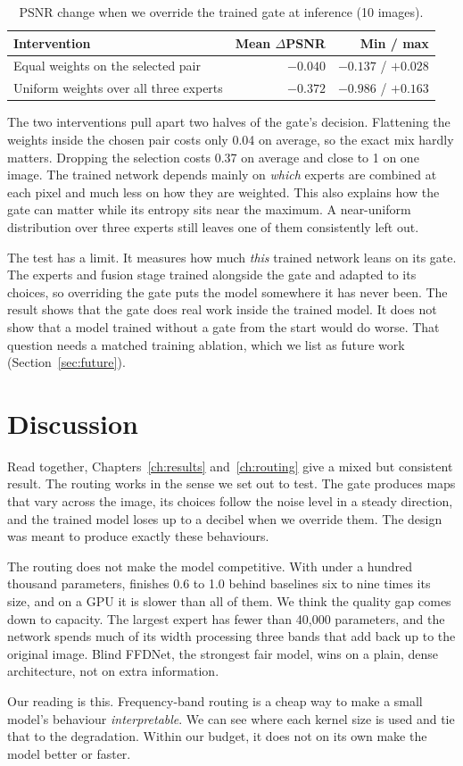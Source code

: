 \begin{table}[htbp]
	\centering
	\caption{PSNR change when we override the trained gate at inference (10 images).}
	\label{tab:interventions}
	\begin{tabular}{@{}lrr@{}}
		\toprule
		Intervention & Mean $\Delta$PSNR & Min / max \\
		\midrule
		Equal weights on the selected pair    & $-0.040$\dB & $-0.137$ / $+0.028$ \\
		Uniform weights over all three experts & $-0.372$\dB & $-0.986$ / $+0.163$ \\
		\bottomrule
	\end{tabular}
\end{table}

The two interventions pull apart two halves of the gate's decision.
Flattening the weights inside the chosen pair costs only 0.04\dB{} on
average, so the exact mix hardly matters. Dropping the selection costs
0.37\dB{} on average and close to 1\dB{} on one image. The trained network
depends mainly on \emph{which} experts are combined at each pixel and much
less on how they are weighted. This also explains how the gate can matter
while its entropy sits near the maximum. A near-uniform distribution over
three experts still leaves one of them consistently left out.

The test has a limit. It measures how much \emph{this} trained network leans
on its gate. The experts and fusion stage trained alongside the gate and
adapted to its choices, so overriding the gate puts the model somewhere it
has never been. The result shows that the gate does real work inside the
trained model. It does not show that a model trained without a gate from the
start would do worse. That question needs a matched training ablation, which
we list as future work (Section~\ref{sec:future}).

\section{Discussion}\label{sec:discussion}

Read together, Chapters~\ref{ch:results} and~\ref{ch:routing} give a mixed
but consistent result. The routing works in the sense we set out to test. The
gate produces maps that vary across the image, its choices follow the noise
level in a steady direction, and the trained model loses up to a decibel when
we override them. The design was meant to produce exactly these behaviours.

The routing does not make the model competitive. With under a hundred
thousand parameters, \fcsg{} finishes 0.6 to 1.0\dB{} behind baselines six to
nine times its size, and on a GPU it is slower than all of them. We think
the quality gap comes down to capacity. The largest expert has fewer than
40,000 parameters, and the network spends much of its width processing three
bands that add back up to the original image. Blind FFDNet, the strongest
fair model, wins on a plain, dense architecture, not on extra information.

Our reading is this. Frequency-band routing is a cheap way to make a small
model's behaviour \emph{interpretable}. We can see where each kernel size is
used and tie that to the degradation. Within our budget, it does not on its
own make the model better or faster.
